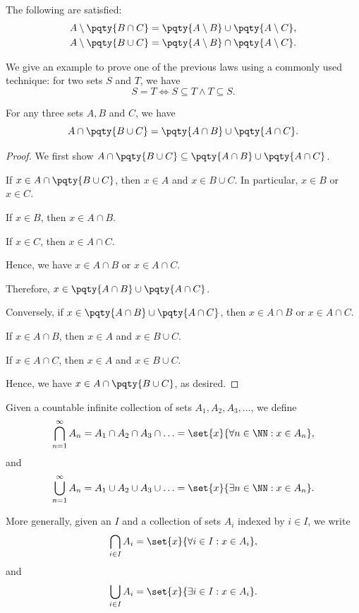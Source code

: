 \begin{proposition}
    The following are satisfied:
    \begin{align*}
        A \setminus \pqty{B \cap C} &= \pqty{A \setminus B} \cup \pqty{A \setminus C}, \\
        A \setminus \pqty{B \cup C} &= \pqty{A \setminus B} \cap \pqty{A \setminus C}.
    \end{align*}
\end{proposition}

We give an example to prove one of the previous laws using a commonly used technique: for two sets \(S\) and \(T\), we have
\[
    S = T \iff S \subseteq T \land T \subseteq S.
\]

\begin{claim}
    For any three sets \(A, B\) and \(C\), we have
    \[
        A \cap \pqty{B \cup C} = \pqty{A \cap B} \cup \pqty{A \cap C}.
    \]
\end{claim}

\begin{proof}
    We first show \(A \cap \pqty{B \cup C} \subseteq \pqty{A \cap B} \cup \pqty{A \cap C}\).

    If \(x \in A \cap \pqty{B \cup C}\), then \(x \in A\) and \(x \in B \cup C\). In particular, \(x \in B\) or \(x \in C\).

    If \(x \in B\), then \(x \in A \cap B\).

    If \(x \in C\), then \(x \in A \cap C\).

    Hence, we have \(x \in A \cap B\) or \(x \in A \cap C\).

    Therefore, \(x \in \pqty{A \cap B} \cup \pqty{A \cap C}\).

    Conversely, if \(x \in \pqty{A \cap B} \cup \pqty{A \cap C}\), then \(x \in A \cap B\) or \(x \in A \cap C\).

    If \(x \in A \cap B\), then \(x \in A\) and \(x \in B \cup C\).

    If \(x \in A \cap C\), then \(x \in A\) and \(x \in B \cup C\).

    Hence, we have \(x \in A \cap \pqty{B \cup C}\), as desired.
\end{proof}

\begin{definition}
    Given a countable infinite collection of sets \(A_1, A_2, A_3, \ldots\), we define
    \[
        \bigcap_{n = 1}^{\infty} A_n = A_1 \cap A_2 \cap A_3 \cap \ldots = \set{x}{\forall n \in \NN: x \in A_n},
    \]
    and
    \[
        \bigcup_{n = 1}^{\infty} A_n = A_1 \cup A_2 \cup A_3 \cup \ldots = \set{x}{\exists n \in \NN: x \in A_n}.
    \]

    More generally, given an  \(I\) and a collection of sets \(A_i\) indexed by \(i \in I\), we write
    \[
        \bigcap_{i \in I} A_i = \set{x}{\forall i \in I: x \in A_i},
    \]
    and
    \[
        \bigcup_{i \in I} A_i = \set{x}{\exists i \in I: x \in A_i}.
    \]
\end{definition}

